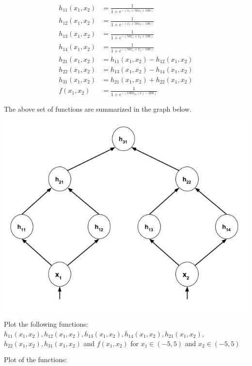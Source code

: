 \documentclass[solution,addpoints,12pt]{exam}
\begin{document}
\begin{questions}
\begin{parts}
                  \begin{align*}
                    h_{11}(x_1, x_2) &= \frac{1}{1 + e^{-(x_1 + 50x_2 + 100)}}  \\
                    h_{12}(x_1, x_2) &= \frac{1}{1 + e^{-(x_1 + 50x_2 - 100)}}  \\
                    h_{13}(x_1, x_2) &= \frac{1}{1 + e^{-(50x_1 + x_2 + 100)}}  \\
                    h_{14}(x_1, x_2) &= \frac{1}{1 + e^{-(50x_1 + x_2 - 100)}}  \\
                    h_{21}(x_1, x_2) &= h_{11}(x_1, x_2) - h_{12}(x_1, x_2)\\
                    h_{22}(x_1, x_2) &= h_{13}(x_1, x_2) - h_{14}(x_1, x_2)\\
                    h_{31}(x_1, x_2) &= h_{21}(x_1, x_2) + h_{22}(x_1, x_2)\\
                    f(x_1, x_2) &= \frac{1}{1 + e^{-(100h_{31}(x) - 200)}}  \\\\
                  \end{align*}
                  The above set of functions are summarized in the graph below.
                    \begin{center}
            		  \includegraphics[scale=0.35]{sig3d}
          		    \end{center} 
                  Plot the following functions: $h_{11}(x_1, x_2), h_{12}(x_1, x_2), h_{13}(x_1, x_2), h_{14}(x_1, x_2), h_{21}(x_1, x_2),$ $h_{22}(x_1, x_2), h_{31}(x_1, x_2)$ and $f(x_1, x_2)$ for $x_1 \in (-5, 5)$ and $x_2 \in (-5, 5)$
            \begin{solution}
            \vspace*{0mm}
            Plot of the functions:\\ 
            

\end{solution}
\end{parts}
\end{questions}
\end{document}

